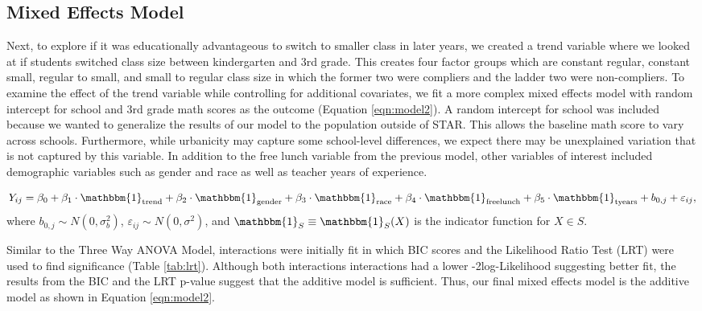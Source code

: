 \documentclass[11pt]{article}
\begin{document}
\subsection{Mixed Effects Model}

Next, to explore if it was educationally advantageous to switch to smaller class in later years, we created a trend variable where we looked at if students switched class size between kindergarten and 3rd grade. This creates four factor groups which are constant regular, constant small, regular to small, and small to regular class size in which the former two were compliers and the ladder two were non-compliers. To examine the effect of the trend variable while controlling for additional covariates, we fit a more complex mixed effects model with random intercept for school and 3rd grade math scores as the outcome (Equation \eqref{eqn:model2}). A random intercept for school was included because we wanted to generalize the results of our model to the population outside of STAR. This allows the baseline math score to vary across schools. Furthermore, while urbanicity may capture some school-level differences, we expect there may be unexplained variation that is not captured by this variable. In addition to the free lunch variable from the previous model, other variables of interest included demographic variables such as gender and race as well as teacher years of experience. 

\begin{equation}
    \label{eqn:model2}
    Y_{ij} = \beta_0
        + \beta_1 \cdot \mathbbm{1}_{\mathrm{trend}}
        + \beta_2 \cdot \mathbbm{1}_{\mathrm{gender}}
        + \beta_3 \cdot \mathbbm{1}_{\mathrm{race}}
        + \beta_4 \cdot \mathbbm{1}_{\mathrm{freelunch}}
        + \beta_5 \cdot \mathbbm{1}_{\mathrm{tyears}}
        + b_{0,j} + \varepsilon_{ij},
\end{equation}
where $b_{0,j} \sim N(0, \sigma_b^2)$, $\varepsilon_{ij} \sim N(0, \sigma^2)$, and $\mathbbm{1}_{S} \equiv \mathbbm{1}_{S}(X)$ is the indicator function for $X \in S$.

Similar to the Three Way ANOVA Model, interactions were initially fit in which BIC scores and the Likelihood Ratio Test (LRT) were used to find significance (Table \ref{tab:lrt}). Although both interactions interactions had a lower -2log-Likelihood suggesting better fit, the results from the BIC and the LRT p-value suggest that the additive model is sufficient. Thus, our final mixed effects model is the additive model as shown in Equation \eqref{eqn:model2}. 
\end{document}
